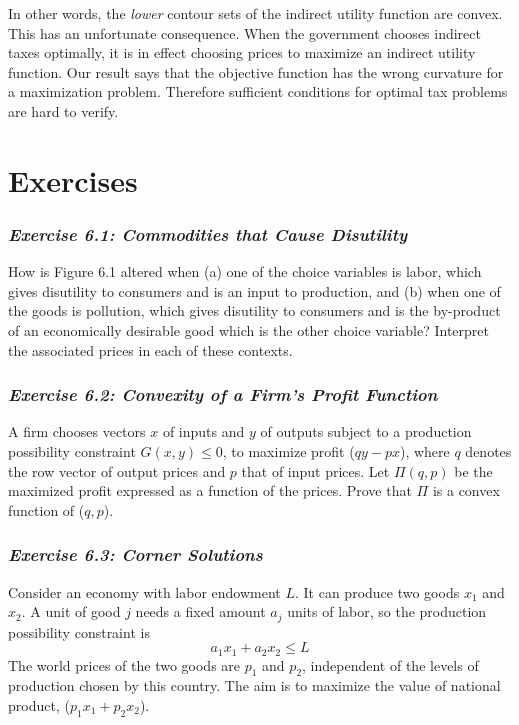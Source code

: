 In other words, the \textit{lower} contour sets of the indirect utility function are convex. This has an unfortunate 
consequence. When the government chooses indirect taxes optimally, it is in effect choosing prices to maximize an indirect utility function. Our result says that the objective function has the wrong curvature for a maximization problem. Therefore sufficient conditions for optimal tax problems are hard to verify.

\section*{Exercises} 

\subsubsection*{\textit{Exercise 6.1: Commodities that Cause Disutility}}

How is Figure 6.1 altered when (a) one of the choice variables is labor, which gives disutility to consumers and is an input to production, and (b) when one of the goods is pollution, which gives disutility to consumers and is the by-product of an economically desirable good which is the other choice variable? Interpret the associated prices in each of these contexts.

\subsubsection*{\textit{Exercise 6.2: Convexity of a Firm's Profit Function}}

A firm chooses vectors $x$ of inputs and $y$ of outputs subject to a production possibility constraint $G(x,y) \leq 0$, to maximize profit ($qy-px$), where $q$ denotes the row vector of output prices and $p$ that of input prices. Let $\Pi(q,p)$ be the maximized profit expressed as a function of the prices. Prove that $\Pi$ is a convex function of ($q,p$).

\subsubsection*{\textit{Exercise 6.3: Corner Solutions}}

Consider an economy with labor endowment $L$. It can produce two goods $x_1$ and $x_2$. A unit of good $j$ needs a fixed amount $a_j$ units of labor, so the production possibility constraint is 
\begin{equation*}
a_1 x_1 + a_2 x_2 \leq L
\end{equation*}
The world prices of the two goods are $p_1$ and $p_2$, independent of the levels of production chosen by this country. The aim is to maximize the value of national product, ($p_1 x_1 + p_2 x_2$).

